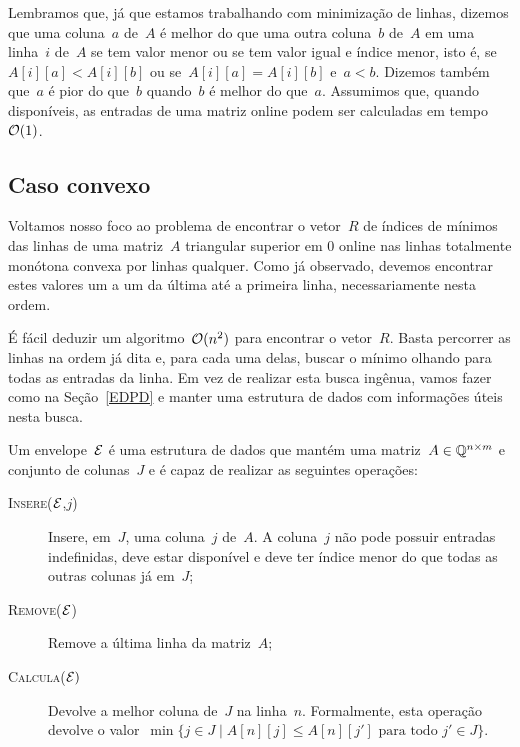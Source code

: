 Lembramos que, já que estamos trabalhando com minimização de linhas, dizemos que uma coluna~$a$ de~$A$ é melhor do que uma outra coluna~$b$ de~$A$ em uma linha~$i$ de~$A$ se tem valor menor ou se tem valor igual e índice menor, isto é, se~$A[i][a] < A[i][b]$ ou se~$A[i][a] = A[i][b]$ e~$a < b$. Dizemos também que~$a$ é pior do que~$b$ quando~$b$ é melhor do que~$a$. Assumimos que, quando disponíveis, as entradas de uma matriz online podem ser calculadas em tempo~$\mathcal{O}(1)$.


\subsection{Caso convexo} \label{Online:convex}

Voltamos nosso foco ao problema de encontrar o vetor~$R$ de índices de mínimos das linhas de uma matriz~$A$ triangular superior em 0 online nas linhas totalmente monótona convexa por linhas qualquer. Como já observado, devemos encontrar estes valores um a um da última até a primeira linha, necessariamente nesta ordem. 

É fácil deduzir um algoritmo~$\mathcal{O}(n^2)$ para encontrar o vetor~$R$. Basta percorrer as linhas na ordem já dita e, para cada uma delas, buscar o mínimo olhando para todas as entradas da linha. Em vez de realizar esta busca ingênua, vamos fazer como na Seção~\ref{EDPD} e manter uma estrutura de dados com informações úteis nesta busca.

\begin{defi}[Envelope]
Um envelope~$\mathcal{E}$ é uma estrutura de dados que mantém uma matriz~${ A \in \mathbb{Q}^{ n \times m } }$ e conjunto de colunas~$J$ e é capaz de realizar as seguintes operações:

\begin{description}
    \item[\textsc{Insere}($\mathcal{E}$,$j$)] Insere, em~$J$, uma coluna~$j$ de~$A$. A coluna~$j$ não pode possuir entradas indefinidas, deve estar disponível e deve ter índice menor do que todas as outras colunas já em~$J$;
    \item[\textsc{Remove}($\mathcal{E}$)] Remove a última linha da matriz~$A$;
    \item[\textsc{Calcula}($\mathcal{E})$] Devolve a melhor coluna de~$J$ na linha~$n$. Formalmente, esta operação devolve o valor~${ \min\{ j \in J \mid A[n][j] \leq A[n][j'] \text{ para todo } j' \in J \} }$.
\end{description}
\end{defi}

